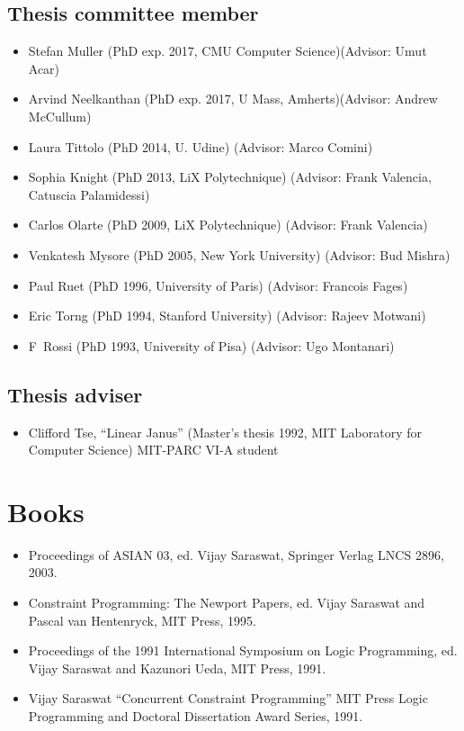 \documentclass{article}
\begin{document}
\subsection*{Thesis committee member}
\begin{itemize}
\item Stefan Muller (PhD exp. 2017, CMU Computer Science)(Advisor: Umut Acar)
\item Arvind Neelkanthan (PhD exp. 2017, U Mass, Amherts)(Advisor:  Andrew McCullum)
\item Laura Tittolo (PhD 2014, U. Udine) (Advisor: Marco Comini)
\item Sophia Knight (PhD 2013, LiX Polytechnique) (Advisor: Frank Valencia, Catuscia Palamidessi)
\item Carlos Olarte (PhD 2009, LiX Polytechnique) (Advisor: Frank Valencia)
\item Venkatesh Mysore (PhD 2005, New York University) (Advisor: Bud Mishra)
\item Paul Ruet (PhD 1996, University of Paris) (Advisor: Francois Fages)
\item Eric Torng (PhD 1994, Stanford University) (Advisor: Rajeev Motwani)
\item F~Rossi (PhD 1993, University of Pisa) (Advisor: Ugo Montanari)
\end{itemize}

\subsection*{Thesis adviser}
\begin{itemize}
\item  Clifford Tse, ``Linear Janus'' (Master's thesis 1992, MIT Laboratory for
  Computer Science) MIT-PARC VI-A student
\end{itemize}

\section*{Books}
\begin{itemize}
\item Proceedings of ASIAN 03, ed.{} Vijay Saraswat, Springer Verlag
  LNCS 2896, 2003.
\item  Constraint Programming: The Newport Papers, ed.{} Vijay
  Saraswat and Pascal van Hentenryck, MIT Press, 1995.
\item   Proceedings of the 1991 International Symposium on Logic
  Programming, ed.{} Vijay Saraswat and Kazunori Ueda, MIT Press,
  1991.
\item   Vijay Saraswat ``Concurrent Constraint Programming'' MIT
  Press Logic Programming and Doctoral Dissertation Award Series,
  1991.
\end{itemize}
\end{document}
